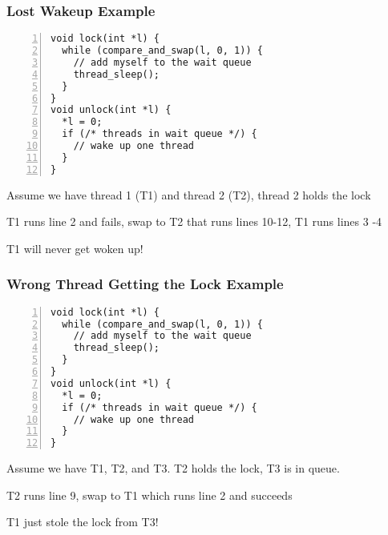   \begin{frame}[fragile]
    \frametitle{Lost Wakeup Example}

    \begin{lstlisting}[numbers=left]
void lock(int *l) {
  while (compare_and_swap(l, 0, 1)) {
    // add myself to the wait queue
    thread_sleep();
  }
}
void unlock(int *l) {
  *l = 0;
  if (/* threads in wait queue */) {
    // wake up one thread
  }
}
    \end{lstlisting}

    Assume we have thread 1 (T1) and thread 2 (T2), thread 2 holds the lock

    \hspace{2em} T1 runs line 2 and fails, swap to T2 that runs lines 10-12, T1
    runs lines 3 -4

    \hspace{4em} T1 will never get woken up!
  \end{frame}

  \begin{frame}[fragile]
    \frametitle{Wrong Thread Getting the Lock Example}

    \begin{lstlisting}[numbers=left]
void lock(int *l) {
  while (compare_and_swap(l, 0, 1)) {
    // add myself to the wait queue
    thread_sleep();
  }
}
void unlock(int *l) {
  *l = 0;
  if (/* threads in wait queue */) {
    // wake up one thread
  }
}
    \end{lstlisting}

    Assume we have T1, T2, and T3. T2 holds the lock, T3 is in queue.

    \hspace{2em} T2 runs line 9, swap to T1 which runs line 2 and succeeds

    \hspace{4em} T1 just stole the lock from T3!
  \end{frame}

